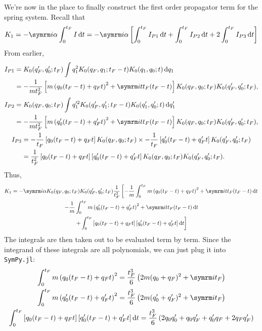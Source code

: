 We're now in the place to finally construct the first order propagator term for the spring system. Recall that
\begin{equation}
    K_1 = -\im\alpha\int_0^{t_F} I\dd{t} = -\im\alpha\left[\int_0^{t_F}I_{P1}\dd{t} + \int_0^{t_F}I_{P2}\dd{t} + 2\int_0^{t_F}I_{P3}\dd{t}\right]
\end{equation}
From earlier,
\begin{gather}
    \begin{aligned}
        I_{P1} &= K_0(q_F', q_0'; t_F)\int q_1^2K_0(q_F, q_1; t_F - t)K_0(q_1, q_0; t)\dd{q_1} \\
        &= -\frac{1}{mt_F^2}\left[m\left(q_0(t_F - t) + q_Ft\right)^2 + \im tt_F(t_F - t)\right]K_0(q_F, q_0; t_F)K_0(q_F', q_0'; t_F),
    \end{aligned}
    \\
    \begin{aligned}
        I_{P2} &= K_0(q_F, q_0; t_F)\int q_1'^2 K_0(q_F', q_1'; t_F - t)K_0(q_1', q_0'; t)\dd{q_1'} \\
        &= -\frac{1}{mt_F^2}\left[m\left(q_0'(t_F - t) + q_F't\right)^2 + \im tt_F(t_F - t)\right]K_0(q_F, q_0; t_F)K_0(q_F', q_0'; t_F),
    \end{aligned}
    \\
    \begin{aligned}
        I_{P3} &= -\frac{1}{t_F}\left[q_0(t_F - t) + q_Ft\right]K_0(q_F, q_0; t_F) \times -\frac{1}{t_F}\left[q_0'(t_F - t) + q_F't\right]K_0(q_F', q_0'; t_F) \\
        &= \frac{1}{t_F^2}\left[q_0(t_F - t) + q_Ft\right]\left[q_0'(t_F - t) + q_F't\right]K_0(q_F, q_0; t_F)K_0(q_F', q_0'; t_F).
    \end{aligned}
\end{gather}
Thus,
\begin{multline}
    K_1 = -\im\alpha K_0(q_F, q_0; t_F)K_0(q_F', q_0'; t_F) \frac{1}{t_F^2} \left[-\frac{1}{m}\int_0^{t_F}m\left(q_0(t_F - t) + q_Ft\right)^2 + \im tt_F(t_F - t)\dd{t} \right. \\
    -\frac{1}{m}\int_0^{t_F}m\left(q_0'(t_F - t) + q_F't\right)^2 + \im tt_F(t_F - t)\dd{t} \\
    \left. + \int_0^{t_F}\left[q_0(t_F - t) + q_Ft\right]\left[q_0'(t_F - t) + q_F't\right]\dd{t}\right]
\end{multline}
The integrals are then taken out to be evaluated term by term. Since the integrand of these integrals are all polynomials, we can just plug it into \texttt{SymPy.jl}:
\begin{gather}
    \int_0^{t_F}m\left(q_0(t_F - t) + q_Ft\right)^2 = \frac{t_F^3}{6}\left(2m(q_0 + q_F)^2 + \im t_F\right) \\
    \int_0^{t_F}m\left(q_0'(t_F - t) + q_F't\right)^2 = \frac{t_F^3}{6}\left(2m(q_0' + q_F')^2 + \im t_F\right) \\
    \int_0^{t_F}\left[q_0(t_F - t) + q_Ft\right]\left[q_0'(t_F - t) + q_F't\right]\dd{t} = \frac{t_F^3}{6}\left(2q_0q_0' + q_0q_F' + q_0'q_F + 2q_Fq_F'\right)
\end{gather}
